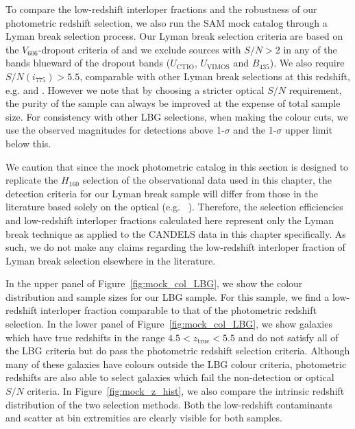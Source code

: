 To compare the low-redshift interloper fractions and the robustness of our photometric redshift selection, we also run the SAM mock catalog through a Lyman break selection process. Our Lyman break selection criteria are based on the $V_{606}$-dropout criteria of \citet{2012ApJ...754...83B} and we exclude sources with $S/N > 2$ in any of the bands blueward of the dropout bands ($U_{\text{CTIO}}$, $U_{\text{VIMOS}}$ and $B_{435}$). We also require $S/N(i_{775}) > 5.5$, comparable with other Lyman break selections at this redshift, e.g. \citet{Giavalisco:2004et} and \citet{2006AJ....132.1729B}. However we note that by choosing a stricter optical $S/N$ requirement, the purity of the sample can always be improved at the expense of total sample size. For consistency with other LBG selections, when making the colour cuts, we use the observed magnitudes for detections above 1-$\sigma$ and the 1-$\sigma$ upper limit below this.

We caution that since the mock photometric catalog in this section is designed to replicate the $H_{160}$ selection of the observational data used in this chapter, the detection criteria for our Lyman break sample will differ from those in the literature based solely on the optical (e.g. \citeauthor{2007ApJ...670..928B}~\citeyear{2007ApJ...670..928B}). Therefore, the selection efficiencies and low-redshift interloper fractions calculated here represent only the Lyman break technique as applied to the CANDELS data in this chapter specifically. As such, we do not make any claims regarding the low-redshift interloper fraction of Lyman break selection elsewhere in the literature.

In the upper panel of Figure~\ref{fig:mock_col_LBG}, we show the colour distribution and sample sizes for our LBG sample. For this sample, we find a low-redshift interloper fraction comparable to that of the photometric redshift selection. In the lower panel of Figure~\ref{fig:mock_col_LBG}, we show galaxies which have true redshifts in the range $4.5 < z_{\text{true}} < 5.5$ and do not satisfy all of the LBG criteria but do pass the photometric redshift selection criteria. Although many of these galaxies have colours outside the LBG colour criteria, photometric redshifts are also able to select galaxies which fail the non-detection or optical $S/N$ criteria. In Figure~\ref{fig:mock_z_hist}, we also compare the intrinsic redshift distribution of the two selection methods. Both the low-redshift contaminants and scatter at bin extremities are clearly visible for both samples.

